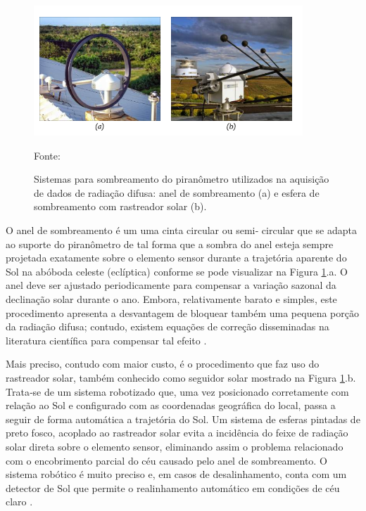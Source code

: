 \begin{figure}[H]
    \centering
    \includegraphics[width=0.9\textwidth]{./Figuras/sis_sombra.png}
    \caption{Sistemas para sombreamento do piranômetro utilizados na aquisição de dados de radiação difusa: anel de sombreamento (a) e esfera de sombreamento com rastreador solar (b).}{Fonte: \cite{atlas2017}}
   \label{fig:sis_sombra}
\end{figure}

O anel de sombreamento é um uma cinta circular ou semi‐ circular que se adapta ao suporte do piranômetro de tal forma que a sombra do anel esteja sempre projetada exatamente sobre o elemento sensor durante a trajetória aparente do Sol na abóboda celeste (eclíptica) conforme se pode visualizar na Figura \ref{fig:sis_sombra}.a. O anel deve ser ajustado periodicamente para compensar a variação sazonal da declinação solar durante o ano. Embora, relativamente barato e simples, este procedimento apresenta a desvantagem de bloquear também uma pequena porção da radiação difusa; contudo, existem equações de correção disseminadas na literatura científica para compensar tal efeito \cite{atlas2017}.

Mais preciso, contudo com maior custo, é o procedimento que faz uso do rastreador solar, também conhecido como seguidor solar mostrado na Figura \ref{fig:sis_sombra}.b. Trata‐se de um sistema robotizado que, uma vez posicionado corretamente com relação ao Sol e configurado com as coordenadas geográfica do local, passa a seguir de forma automática a trajetória do Sol. Um sistema de esferas pintadas de preto fosco, acoplado ao rastreador solar evita a incidência do feixe de radiação solar direta sobre o elemento sensor, eliminando assim o problema relacionado com o encobrimento parcial do céu causado pelo anel de sombreamento. O sistema robótico é muito preciso e, em casos de desalinhamento, conta com um detector de Sol que permite o realinhamento automático em condições de céu claro \cite{atlas2017}.

